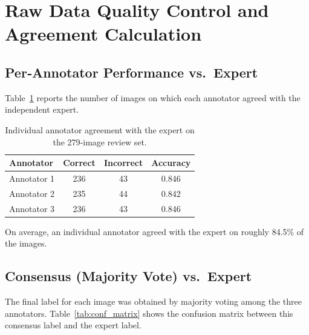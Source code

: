 \section{Raw Data Quality Control and Agreement Calculation}
\label{app:quality_control_raw}

\subsection{Per‑Annotator Performance vs.\ Expert}

Table~\ref{tab:raw_annotator} reports the number of images on which each annotator agreed with the independent expert.

\begin{table}[htbp]
\centering
\caption{Individual annotator agreement with the expert on the 279‑image review set.}
\label{tab:raw_annotator}
\small
\setlength{\tabcolsep}{6pt}
\begin{tabular}{l c c c}
\toprule
\textbf{Annotator} & \textbf{Correct} & \textbf{Incorrect} & \textbf{Accuracy} \\
\midrule
Annotator 1 & 236 & 43 & 0.846 \\
Annotator 2 & 235 & 44 & 0.842 \\
Annotator 3 & 236 & 43 & 0.846 \\
\bottomrule
\end{tabular}
\end{table}

On average, an individual annotator agreed with the expert on roughly 84.5\% of the images.

\subsection{Consensus (Majority Vote) vs.\ Expert}

The final label for each image was obtained by majority voting among the three annotators. Table~\ref{tab:conf_matrix} shows the confusion matrix between this consensus label and the expert label.

